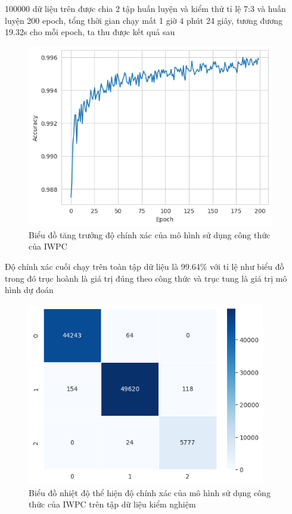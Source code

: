 \documentclass[14pt,oneside]{scrbook}
\begin{document}
100000 dữ liệu trên được chia 2 tập huấn luyện và kiểm thử tỉ lệ 7:3 và
huấn luyện 200 epoch, tổng thời gian chạy mất 1 giờ 4 phút 24 giây,
tương đương 19.32s cho mỗi epoch, ta thu được kết quả sau

\begin{figure}
\centering
\includegraphics[width=\textwidth,height=8cm]{image/iwpc_accu.png}
\caption{Biểu đồ tăng trưởng độ chính xác của mô hình sử dụng công thức
của IWPC}
\end{figure}

Độ chính xác cuối chạy trên toàn tập dữ liệu là 99.64\% với tỉ lệ như
biểu đồ trong đó trục hoành là giá trị đúng theo công thức và trục tung
là giá trị mô hình dự đoán

\begin{figure}
\centering
\includegraphics[width=\textwidth,height=8cm]{image/iwpc_heatmap.png}
\caption{Biểu đồ nhiệt độ thể hiện độ chính xác của mô hình sử dụng công
thức của IWPC trên tập dữ liệu kiểm nghiệm}
\end{figure}
\end{document}
